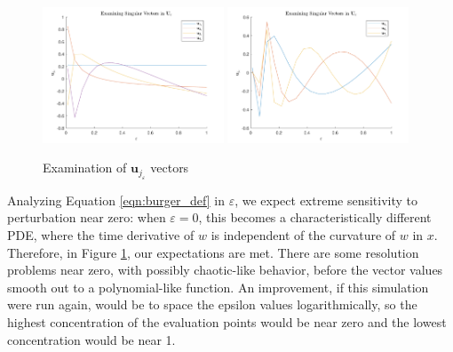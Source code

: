 \documentclass[12pt]{article}
\newcommand{\eps}{\varepsilon}
\begin{document}
    \begin{figure}[t]
        \centering
        \includegraphics[width=0.48\textwidth]{figures/burgers_ueps_1_4.pdf}
        \includegraphics[width=0.48\textwidth]{figures/burgers_ueps_5_7.pdf}
        \caption{Examination of $\mathbf{u}_{j_\eps}$ vectors}
        \label{fig:burgers_ueps}
    \end{figure}

    Analyzing Equation \ref{eqn:burger_def} in $\eps$, we expect extreme sensitivity to perturbation near zero: when $\eps=0$, this becomes a characteristically different PDE, where the time derivative of $w$ is independent of the curvature of $w$ in $x$. Therefore, in Figure \ref{fig:burgers_ueps}, our expectations are met. There are some resolution problems near zero, with possibly chaotic-like behavior, before the vector values smooth out to a polynomial-like function. An improvement, if this simulation were run again, would be to space the epsilon values logarithmically, so the highest concentration of the evaluation points would be near zero and the lowest concentration would be near 1.
\end{document}
